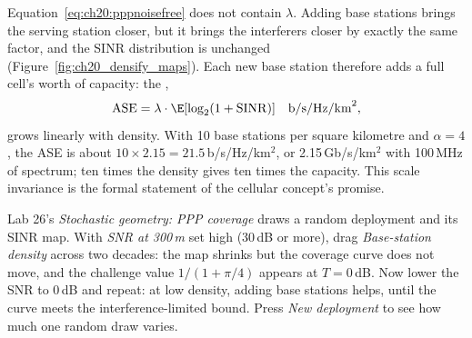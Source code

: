 
\begin{keyidea}
Equation~\eqref{eq:ch20:pppnoisefree} does not contain $\lambda$. Adding base stations brings the serving station
closer, but it brings the interferers closer by exactly the same factor, and the SINR distribution is unchanged
(Figure~\ref{fig:ch20_densify_maps}). Each new base station therefore adds a full cell's worth of capacity: the
,
\begin{equation}
\mathrm{ASE}=\lambda\cdot\E[\log_2(1+\mathrm{SINR})]\quad\text{b/s/Hz/km}^2,
\end{equation}
grows linearly with density. With 10 base stations per square kilometre and $\alpha=4$, the ASE is about
$10\times2.15=21.5$\,b/s/Hz/km$^2$, or 2.15\,Gb/s/km$^2$ with 100\,MHz of spectrum; ten times the density gives ten
times the capacity. This scale invariance is the formal statement of the cellular concept's promise.
\end{keyidea}

\begin{tryit}
Lab 26's \emph{Stochastic geometry: PPP coverage} draws a random deployment and its SINR map. With \emph{SNR at 300\,m}
set high (30\,dB or more), drag \emph{Base-station density} across two decades: the map shrinks but the coverage curve
does not move, and the challenge value $1/(1+\pi/4)$ appears at $T=0$\,dB. Now lower the SNR to 0\,dB and repeat:
at low density, adding base stations helps, until the curve meets the interference-limited bound. Press
\emph{New deployment} to see how much one random draw varies.
\end{tryit}


